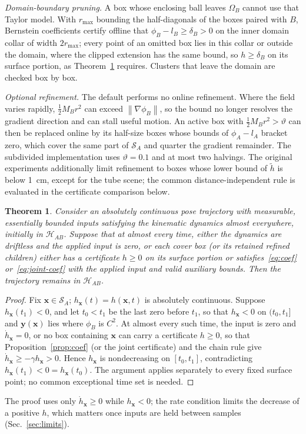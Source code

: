 \documentclass[journal]{IEEEtran}
\newtheorem{theorem}{Theorem}
\theoremstyle{definition}
\newcommand{\norm}[1]{\left\lVert #1\right\rVert}
\begin{document}
\emph{Domain-boundary pruning.} A box whose enclosing ball leaves $\Omega_B$ cannot use that Taylor
model. With $r_{\max}$ bounding the half-diagonals of the boxes paired with $B$, Bernstein
coefficients certify offline that $\phi_B-l_B\ge\delta_B>0$ on the inner domain collar of width
$2r_{\max}$; every point of an omitted box lies in this collar or outside the domain, where the
clipped extension has the same bound, so $h\ge\delta_B$ on its surface portion, as
Theorem~\ref{thm:invariance} requires. Clusters that leave the domain are checked box by box.

\emph{Optional refinement.} The default performs no online refinement. Where the field varies
rapidly, $\frac12M_Br^2$ can exceed $\norm{\nabla\phi_B}$, so the bound no longer resolves the
gradient direction and can stall useful motion. An active box with $\frac12M_Br^2>\vartheta$ can then
be replaced online by its half-size boxes whose bounds of $\phi_A-l_A$ bracket zero, which cover
the same part of $\mathcal S_A$ and quarter the gradient remainder. The subdivided implementation
uses $\vartheta=0.1$ and at most two halvings.
The original experiments additionally limit refinement to boxes whose lower bound of $\tilde h$
is below 1~cm, except for the tube scene; the common distance-independent rule is evaluated
in the certificate comparison below.
\begin{theorem}\label{thm:invariance}
Consider an absolutely continuous pose trajectory with measurable, essentially bounded inputs
satisfying the kinematic dynamics almost everywhere, initially in $\mathcal H_{AB}$. Suppose that
at almost every time, either the dynamics are driftless and the applied input is zero, or each
cover box (or its retained refined children) either has a certificate $h\ge0$ on its surface
portion or satisfies~\eqref{eq:coef} or~\eqref{eq:joint-coef} with the applied input and valid
auxiliary bounds. Then the trajectory remains in $\mathcal H_{AB}$.
\end{theorem}
\begin{proof}
Fix $\mathbf x\in\mathcal S_A$; $h_{\mathbf x}(t)=h(\mathbf x,t)$ is absolutely continuous.
Suppose $h_{\mathbf x}(t_1)<0$, and let $t_0<t_1$ be the last zero before $t_1$, so that
$h_{\mathbf x}<0$ on $(t_0,t_1]$ and $\mathbf y(\mathbf x)$ lies where $\phi_B$ is $C^2$. At almost
every such time, the input is zero and $\dot h_{\mathbf x}=0$, or no box containing $\mathbf x$ can
carry a certificate $h\ge0$, so that Proposition~\ref{prop:coef} (or the joint certificate) and
the chain rule give $\dot h_{\mathbf x}\ge-\gamma h_{\mathbf x}>0$. Hence $h_{\mathbf x}$ is
nondecreasing on $[t_0,t_1]$, contradicting $h_{\mathbf x}(t_1)<0=h_{\mathbf x}(t_0)$. The argument
applies separately to every fixed surface point; no common exceptional time set is needed.
\end{proof}
The proof uses only $\dot h_{\mathbf x}\ge0$ while $h_{\mathbf x}<0$; the rate condition limits
the decrease of a positive $h$, which matters once inputs are held between samples (Sec.~\ref{sec:limits}).
\end{document}
